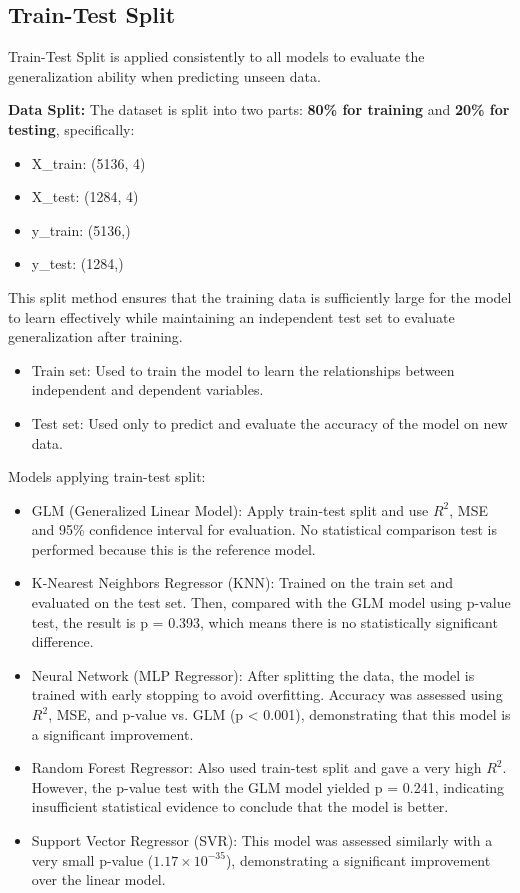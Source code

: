 \subsection{Train-Test Split}

Train-Test Split is applied consistently to all models to evaluate the generalization ability when predicting unseen data.

\textbf{Data Split:} The dataset is split into two parts: \textbf{80\% for training} and \textbf{20\% for testing}, specifically:
\begin{itemize}
    \item X\_train: (5136, 4)
    \item X\_test: (1284, 4)
    \item y\_train: (5136,)
    \item y\_test: (1284,)
\end{itemize}

This split method ensures that the training data is sufficiently large for the model to learn effectively while maintaining an independent test set to evaluate generalization after training.
\begin{itemize}
\item Train set: Used to train the model to learn the relationships between independent and dependent variables.
\item Test set: Used only to predict and evaluate the accuracy of the model on new data.
\end{itemize}

Models applying train-test split:
\begin{itemize}
\item GLM (Generalized Linear Model): Apply train-test split and use $R^2$, MSE and 95\% confidence interval for evaluation. No statistical comparison test is performed because this is the reference model.
\item K-Nearest Neighbors Regressor (KNN): Trained on the train set and evaluated on the test set. Then, compared with the GLM model using p-value test, the result is p = 0.393, which means there is no statistically significant difference.
\item Neural Network (MLP Regressor): After splitting the data, the model is trained with early stopping to avoid overfitting. Accuracy was assessed using $R^2$, MSE, and p-value vs. GLM (p < 0.001), demonstrating that this model is a significant improvement.
\item Random Forest Regressor: Also used train-test split and gave a very high $R^2$. However, the p-value test with the GLM model yielded p = 0.241, indicating insufficient statistical evidence to conclude that the model is better.
\item Support Vector Regressor (SVR): This model was assessed similarly with a very small p-value ($1.17 \times 10^{-35}$), demonstrating a significant improvement over the linear model.
\end{itemize}

